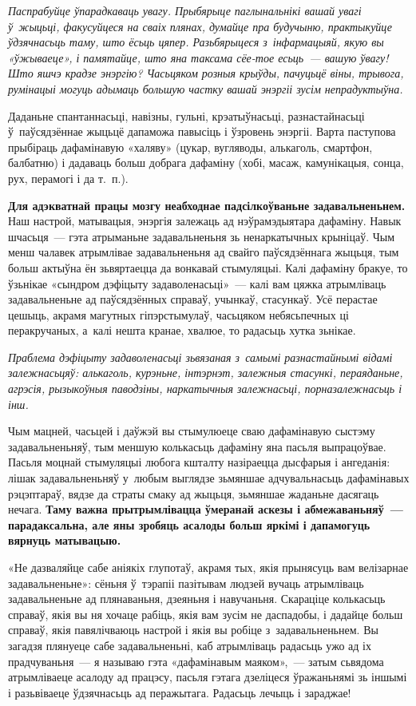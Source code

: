 \emph{Паспрабуйце ўпарадкаваць увагу. Прыбярыце паглынальнікі вашай увагі ў~жыцьці, факусуйцеся на сваіх плянах, думайце пра будучыню, практыкуйце ўдзячнасьць таму, што ёсьць цяпер. Разьбярыцеся з~інфармацыяй, якую вы «ўжываеце», і памятайце, што яна таксама сёе-тое есьць~--- вашую ўвагу! Што яшчэ крадзе энэргію? Часьцяком розныя крыўды, пачуцьцё віны, трывога, румінацыі могуць адымаць большую частку вашай энэргіі зусім непрадуктыўна.}

Даданьне спантаннасьці, навізны, гульні, крэатыўнасьці, разнастайнасьці ў~паўсядзённае жыцьцё дапаможа павысіць і ўзровень энэргіі. Варта паступова прыбіраць дафамінавую «халяву» (цукар, вугляводы, алькаголь, смартфон, балбатню) і дадаваць больш добрага дафаміну (хобі, масаж, камунікацыя, сонца, рух, перамогі і да т.~п.).

\textbf{Для адэкватнай працы мозгу неабходнае падсілкоўваньне задавальненьнем.} Наш настрой, матывацыя, энэргія залежаць ад нэўрамэдыятара дафаміну. Навык шчасьця~--- гэта атрыманьне задавальненьня зь ненаркатычных крыніцаў. Чым менш чалавек атрымлівае задавальненьня ад свайго паўсядзённага жыцьця, тым больш актыўна ён зьвяртаецца да вонкавай стымуляцыі. Калі дафаміну бракуе, то ўзьнікае «сындром дэфіцыту задаволенасьці»~--- калі вам цяжка атрымліваць задавальненьне ад паўсядзённых справаў, учынкаў, стасункаў. Усё перастае цешыць, акрамя магутных гіпэрстымулаў, часьцяком небясьпечных ці перакручаных, а~калі нешта кранае, хвалюе, то радасьць хутка зьнікае.

\emph{Праблема дэфіцыту задаволенасьці зьвязаная з~самымі разнастайнымі відамі залежнасьцяў: алькаголь, курэньне, інтэрнэт, залежныя стасункі, пераяданьне, агрэсія, рызыкоўныя паводзіны, наркатычныя залежнасьці, порназалежнасьць і інш.}

Чым мацней, часьцей і даўжэй вы стымулюеце сваю дафамінавую сыстэму задавальненьняў, тым меншую колькасьць дафаміну яна пасьля выпрацоўвае. Пасьля моцнай стымуляцыі любога кшталту назіраецца дысфарыя і ангеданія: лішак задавальненьняў у~любым выглядзе зьмяншае адчувальнасьць дафамінавых рэцэптараў, вядзе да страты смаку ад жыцьця, зьмяншае жаданьне дасягаць нечага. \textbf{Таму важна прытрымлівацца ўмеранай аскезы і абмежаваньняў~--- парадаксальна, але яны зробяць асалоды больш яркімі і дапамогуць вярнуць матывацыю.}

«Не дазваляйце сабе аніякіх глупотаў, акрамя тых, якія прынясуць вам велізарнае задавальненьне»: сёньня ў~тэрапіі пазітывам людзей вучаць атрымліваць задавальненьне ад плянаваньня, дзеяньня і навучаньня. Скараціце колькасьць справаў, якія вы ня хочаце рабіць, якія вам зусім не даспадобы, і дадайце больш справаў, якія павялічваюць настрой і якія вы робіце з~задавальненьнем. Вы загадзя плянуеце сабе задавальненьні, каб атрымліваць радасьць ужо ад іх прадчуваньня~--- я называю гэта «дафамінавым маяком»,~--- затым сьвядома атрымліваеце асалоду ад працэсу, пасьля гэтага дзеліцеся ўражаньнямі зь іншымі і разьвіваеце ўдзячнасьць ад перажытага. Радасьць лечыць і зараджае!

